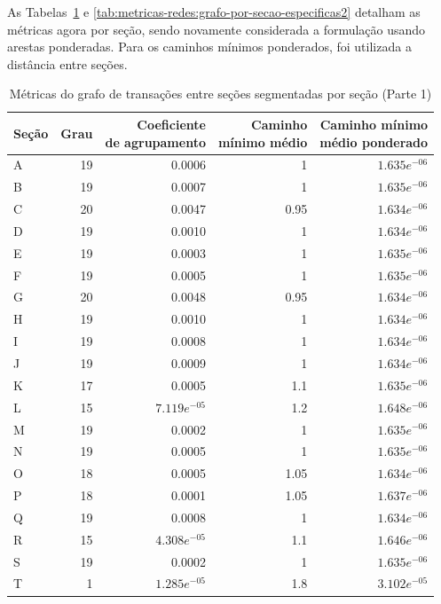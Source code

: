 As Tabelas~\ref{tab:metricas-redes:grafo-por-secao-especificas1} e \ref{tab:metricas-redes:grafo-por-secao-especificas2} detalham as métricas agora por seção, sendo novamente considerada a formulação usando arestas ponderadas. Para os caminhos mínimos ponderados, foi utilizada a distância entre seções.

\begin{table}[htb]
\centering
\caption{Métricas do grafo de transações entre seções segmentadas por seção (Parte 1)}
\label{tab:metricas-redes:grafo-por-secao-especificas1}
    \begin{tabular}{l|rrrr}
    \toprule
    Seção &  Grau &  \shortstack{Coeficiente\\de agrupamento} &  \shortstack{Caminho\\mínimo médio} &  \shortstack{Caminho mínimo\\médio ponderado} \\
    \midrule
    A &  19 &          0.0006 &     1 &  $1.635e^{-06}$ \\
    B &  19 &          0.0007 &     1 &  $1.635e^{-06}$ \\
    C &  20 &          0.0047 &  0.95 &  $1.634e^{-06}$ \\
    D &  19 &          0.0010 &     1 &  $1.634e^{-06}$ \\
    E &  19 &          0.0003 &     1 &  $1.635e^{-06}$ \\
    F &  19 &          0.0005 &     1 &  $1.635e^{-06}$ \\
    G &  20 &          0.0048 &  0.95 &  $1.634e^{-06}$ \\
    H &  19 &          0.0010 &     1 &  $1.634e^{-06}$ \\
    I &  19 &          0.0008 &     1 &  $1.634e^{-06}$ \\
    J &  19 &          0.0009 &     1 &  $1.634e^{-06}$ \\
    K &  17 &          0.0005 &   1.1 &  $1.635e^{-06}$ \\
    L &  15 &  $7.119e^{-05}$ &   1.2 &  $1.648e^{-06}$ \\
    M &  19 &          0.0002 &     1 &  $1.635e^{-06}$ \\
    N &  19 &          0.0005 &     1 &  $1.635e^{-06}$ \\
    O &  18 &          0.0005 &  1.05 &  $1.634e^{-06}$ \\
    P &  18 &          0.0001 &  1.05 &  $1.637e^{-06}$ \\
    Q &  19 &          0.0008 &     1 &  $1.634e^{-06}$ \\
    R &  15 &  $4.308e^{-05}$ &   1.1 &  $1.646e^{-06}$ \\
    S &  19 &          0.0002 &     1 &  $1.635e^{-06}$ \\
    T &   1 &  $1.285e^{-05}$ &   1.8 &  $3.102e^{-05}$ \\
    \bottomrule
    \end{tabular}
\fdadospesquisa
\end{table}

